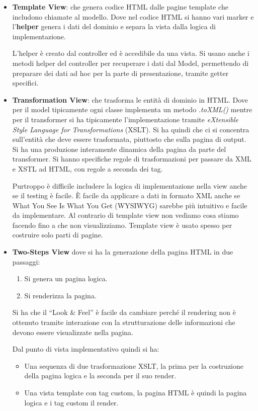 \begin{itemize}
    \item \textbf{Template View}: che genera codice HTML dalle pagine template che includono chiamate al modello. Dove nel codice HTML si hanno vari marker e l'\textbf{helper} genera i dati del dominio e separa la vista dalla logica di implementazione.
    
    L'helper è creato dal controller ed è accedibile da una vista. Si usano anche i metodi helper del controller per recuperare i dati dal Model, permettendo di preparare dei dati ad hoc per la parte di presentazione, tramite getter specifici.
    \item \textbf{Transformation View}: che trasforma le entità di dominio in HTML. Dove per il model tipicamente ogni classe implementa un metodo \textit{.toXML()} mentre per il transformer si ha tipicamente l'implementazione tramite \textit{eXtensible Style Language for Transformations} (XSLT). Si ha quindi che ci si concentra sull'entità che deve essere trasformata, piuttosto che sulla pagina di output. Si ha una produzione interamente dinamica della pagina da parte del transformer. Si hanno specifiche regole di trasformazioni per passare da XML e XSTL ad HTML, con regole a seconda dei tag.
    
    Purtroppo è difficile includere la logica di implementazione nella view anche se il testing è facile. È facile da applicare a dati in formato XML anche se What You See Is What You Get (WYSIWYG) sarebbe più intuitivo e facile da implementare. Al contrario di template view non vediamo cosa stiamo facendo fino a che non visualizziamo. Template view è usato spesso per costruire solo parti di pagine.
    \item \textbf{Two-Steps View} dove si ha la generazione della pagina HTML in due passaggi:
    \begin{enumerate}
        \item Si genera un pagina logica.
        \item Si renderizza la pagina.
    \end{enumerate}
    Si ha che il “Look \& Feel” è facile da cambiare perché il rendering non è ottenuto tramite interazione con la strutturazione delle informazioni che devono essere visualizzate nella pagina.
    
    Dal punto di vista implementativo quindi si ha:
    \begin{itemize}
        \item Una sequenza di due trasformazione XSLT, la prima per la costruzione della pagina logica e la seconda per il suo render.
        \item Una vista template con tag custom, la pagina HTML è quindi la pagina logica e i tag custom il render.
    \end{itemize}
\end{itemize}
